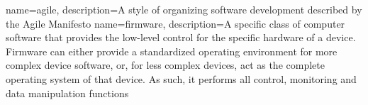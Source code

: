 {
    name=agile,
    description={A style of organizing software development described by the Agile Manifesto}
}
{
    name=firmware,
    description={A specific class of computer software that provides the low-level control for the specific hardware of a device.
        Firmware can either provide a standardized operating environment for more complex device software, or, for less complex devices, act as the complete operating system of that device.
        As such, it performs all control, monitoring and data manipulation functions}
}
